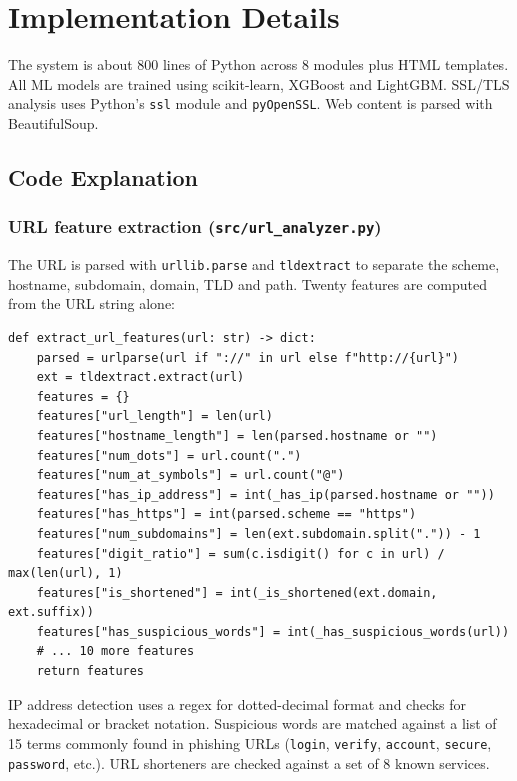 \documentclass[11pt,a4paper]{article}
\begin{document}
\clearpage
\section{Implementation Details}

The system is about 800 lines of Python across 8 modules plus HTML templates. All ML models are trained using scikit-learn, XGBoost and LightGBM. SSL/TLS analysis uses Python's \texttt{ssl} module and \texttt{pyOpenSSL}. Web content is parsed with BeautifulSoup.

\subsection{Code Explanation}

\subsubsection*{URL feature extraction (\texttt{src/url\_analyzer.py})}

The URL is parsed with \texttt{urllib.parse} and \texttt{tldextract} to separate the scheme, hostname, subdomain, domain, TLD and path. Twenty features are computed from the URL string alone:

\begin{lstlisting}
def extract_url_features(url: str) -> dict:
    parsed = urlparse(url if "://" in url else f"http://{url}")
    ext = tldextract.extract(url)
    features = {}
    features["url_length"] = len(url)
    features["hostname_length"] = len(parsed.hostname or "")
    features["num_dots"] = url.count(".")
    features["num_at_symbols"] = url.count("@")
    features["has_ip_address"] = int(_has_ip(parsed.hostname or ""))
    features["has_https"] = int(parsed.scheme == "https")
    features["num_subdomains"] = len(ext.subdomain.split(".")) - 1
    features["digit_ratio"] = sum(c.isdigit() for c in url) / max(len(url), 1)
    features["is_shortened"] = int(_is_shortened(ext.domain, ext.suffix))
    features["has_suspicious_words"] = int(_has_suspicious_words(url))
    # ... 10 more features
    return features
\end{lstlisting}

IP address detection uses a regex for dotted-decimal format and checks for hexadecimal or bracket notation. Suspicious words are matched against a list of 15 terms commonly found in phishing URLs (\texttt{login}, \texttt{verify}, \texttt{account}, \texttt{secure}, \texttt{password}, etc.). URL shorteners are checked against a set of 8 known services.
\end{document}

